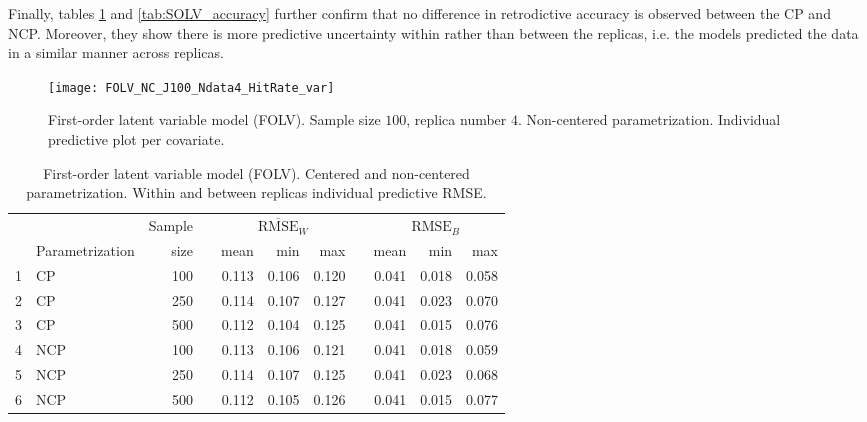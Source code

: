 Finally, tables \ref{tab:FOLV_accuracy} and \ref{tab:SOLV_accuracy} further confirm that no difference in retrodictive accuracy is observed between the CP and NCP. Moreover, they show there is more predictive uncertainty within rather than between the replicas, i.e. the models predicted the data in a similar manner across replicas.
%
\begin{figure}[H]
	\centering
	\texttt{[image: FOLV\_NC\_J100\_Ndata4\_HitRate\_var]}
	\caption[First-order latent variable model (FOLV). Sample size $100$, replica number $4$. Non-centered parametrization. Individual predictive plot per covariate.]%
	{First-order latent variable model (FOLV). Sample size $100$, replica number $4$. Non-centered parametrization. Individual predictive plot per covariate.}
	\label{fig:FOLV_NC_hitrate_var}
\end{figure}
%
\begin{table}[H]
	\centering
	\begin{tabular}{rlrrrrrrrrr}
		\hline
		& & Sample && \multicolumn{3}{c}{ $\overline{\text{RMSE}}_{W}$ } && \multicolumn{3}{c}{ $\text{RMSE}_{B}$ } \\
		\cmidrule(rl){5-7} \cmidrule(rl){9-11}  
		& Parametrization & size  && mean & min & max && mean & min & max \\ 
		\hline\hline
		1 & CP & 100 && 0.113 & 0.106 & 0.120 && 0.041 & 0.018 & 0.058 \\ 
		2 & CP & 250 && 0.114 & 0.107 & 0.127 && 0.041 & 0.023 & 0.070 \\
		3 & CP & 500 && 0.112 & 0.104 & 0.125 && 0.041 & 0.015 & 0.076 \\
		\hline
		4 & NCP & 100 && 0.113 & 0.106 & 0.121 && 0.041 & 0.018 & 0.059 \\ 
		5 & NCP & 250 && 0.114 & 0.107 & 0.125 && 0.041 & 0.023 & 0.068 \\ 
		6 & NCP & 500 && 0.112 & 0.105 & 0.126 && 0.041 & 0.015 & 0.077 \\
		\hline
	\end{tabular}
	\caption[First-order latent variable model (FOLV). Centered and non-centered parametrization. Within and between replicas individual predictive RMSE.]%
	{First-order latent variable model (FOLV). Centered and non-centered parametrization. Within and between replicas individual predictive RMSE.}
	\label{tab:FOLV_accuracy}
\end{table}
%
